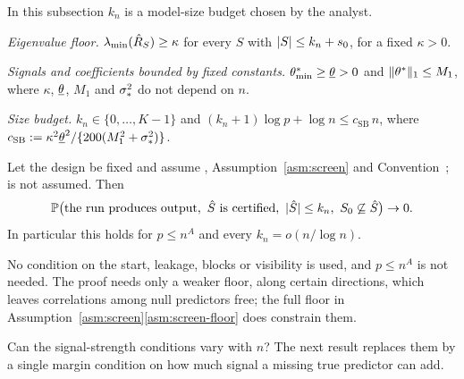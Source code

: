 In this subsection $k_n$ is a model-size budget chosen by the analyst.

\begin{localassumption}\label{asm:screen}
\begin{asmitems}
  \item\label{asm:screen-floor} \emph{Eigenvalue floor.} $\lambda_{\min}(\hat R_S)\ge\kappa$ for every $S$ with $\lvert S\rvert\le k_n+s_0$,
    for a fixed $\kappa>0$.
  \item\label{asm:screen-signal} \emph{Signals and coefficients bounded by fixed constants.} $\theta^*_{\min}\ge\underline\theta>0$ and
    $\lVert \theta^*\rVert_1\le M_1$, where $\kappa$, $\underline\theta$, $M_1$ and $\sigma_*^2$ do not depend on $n$.
  \item\label{asm:screen-budget} \emph{Size budget.} $k_n\in\{0,\dots,K-1\}$ and $(k_n+1)\log p+\log n\le c_{\mathrm{SB}}\,n$,
    where $c_{\mathrm{SB}}:=\kappa^2\underline\theta^2/\{200(M_1^2+\sigma_*^2)\}$.
\end{asmitems}
\end{localassumption}

\begin{theorem}\label{thm:screen}
Let the design be fixed and assume , Assumption~\ref{asm:screen} and Convention~;  is not assumed.
Then
\begin{equation}\label{eq:screen}
  \P\big(\text{the run produces output},\ \Shat\text{ is certified},\ \abs{\Shat}\le k_n,\ \Sz\not\subseteq\Shat\big)\to0 .
\end{equation}
In particular this holds for $p\le n^A$ and every $k_n=o(n/\log n)$.
\end{theorem}


No condition on the start, leakage, blocks or visibility is used, and $p\le n^A$ is not needed. The proof needs only a
weaker floor, along certain directions, which leaves correlations among null predictors free; the full floor
in Assumption~\ref{asm:screen}\ref{asm:screen-floor} does constrain them.

Can the signal-strength conditions vary with $n$? The next result replaces them by a single margin condition on how much
signal a missing true predictor can add.

